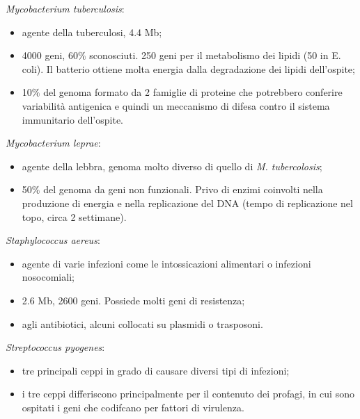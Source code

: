 \begin{multicols}{2}
\begin{itemize}
\end{itemize}
\textit{Mycobacterium tuberculosis}:
\begin{itemize}
    \item agente della tuberculosi, 4.4
 Mb; 
    \item 4000 geni, 60$\%$ sconosciuti. 
250 geni per il metabolismo dei lipidi (50 in E. 
coli). 
Il batterio ottiene molta energia dalla degradazione dei lipidi dell'ospite; 
    \item 10$\%$ del genoma formato da 2 famiglie di proteine che potrebbero conferire variabilit\`a antigenica e quindi un meccanismo di difesa contro il sistema immunitario dell'ospite.
\end{itemize}
\textit{Mycobacterium leprae}:
\begin{itemize}
    \item agente della lebbra, genoma molto diverso di quello di \textit{M. 
tubercolosis};
    \item 50$\%$ del genoma da geni non funzionali. 
Privo di enzimi coinvolti nella produzione di energia e nella replicazione del DNA (tempo di replicazione nel topo, circa 2 settimane).
\end{itemize}
\textit{Staphylococcus aereus}:
\begin{itemize}
    \item agente di varie infezioni come le intossicazioni alimentari o infezioni nosocomiali; 
    \item 2.6
 Mb, 2600 geni. 
Possiede molti geni di resistenza; 
    \item agli antibiotici, alcuni collocati su plasmidi o trasposoni.
\end{itemize}
\textit{Streptococcus pyogenes}:
\begin{itemize}
    \item tre principali ceppi in grado di causare diversi tipi di infezioni; 
    \item i tre ceppi differiscono principalmente per il contenuto dei profagi, in cui sono ospitati i geni che codifcano per fattori di virulenza.
\end{itemize}
\end{multicols}
